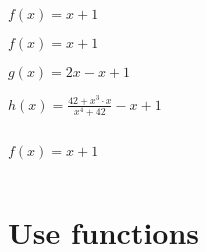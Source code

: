 \documentclass[aspectratio=169]{beamer}
\newcommand{\style}[1]{\ttfamily#1}
\begin{document}
\begin{frame}
  \centering
  \Huge
  $f(x) = x + 1$
\end{frame}

\begin{frame}
  \centering
  \Huge
  $f(x) = x + 1$

  $g(x) = 2x - x + 1$

  $h(x) = \frac{42 + x^3\cdot{}x}{x^4+42} - x + 1$
\end{frame}

\begin{frame}[fragile]
  \begin{columns}
    \begin{column}{0.5\textwidth}
      \LARGE
      $f(x) = x + 1$
    \end{column}
    \begin{column}{0.5\textwidth}
      
    \end{column}
  \end{columns}
\end{frame}

\begin{frame}[fragile]
  
\end{frame}

\begin{frame}[fragile]
  
\end{frame}

\begin{frame}[fragile]
  
\end{frame}

\section{Use functions}

\begin{frame}[fragile]
  
  \vspace{1.5cm}
  
\end{frame}

\begin{frame}[fragile]
  
  \vspace{1.5cm}
  
\end{frame}
\end{document}
